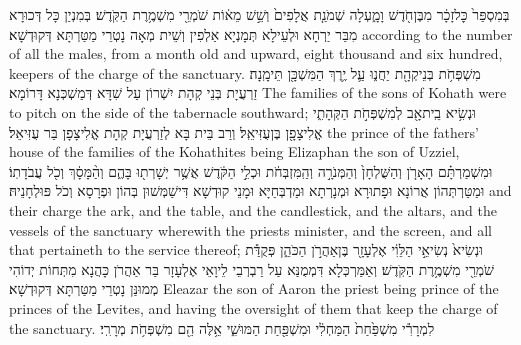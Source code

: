 {בְּמִסְפַּר֙ כׇּל\maqqaf זָכָ֔ר מִבֶּן\maqqaf חֹ֖דֶשׁ וָמָ֑עְלָה שְׁמֹנַ֤ת אֲלָפִים֙ וְשֵׁ֣שׁ מֵא֔וֹת שֹׁמְרֵ֖י מִשְׁמֶ֥רֶת הַקֹּֽדֶשׁ׃}
{בְּמִנְיַן כָּל דְּכוּרָא מִבַּר יַרְחָא וּלְעֵילָא תְּמָנְיָא אַלְפִין וְשֵׁית מְאָה נָטְרֵי מַטַּרְתָּא דְּקוּדְשָׁא׃}
{according to the number of all the males, from a month old and upward, eight thousand and six hundred, keepers of the charge of the sanctuary.}{}
{מִשְׁפְּחֹ֥ת בְּנֵי\maqqaf קְהָ֖ת יַחֲנ֑וּ עַ֛ל יֶ֥רֶךְ הַמִּשְׁכָּ֖ן תֵּימָֽנָה׃}
{זַרְעֲיָת בְּנֵי קְהָת יִשְׁרוֹן עַל שִׁדָּא דְּמַשְׁכְּנָא דָּרוֹמָא׃}
{The families of the sons of Kohath were to pitch on the side of the tabernacle southward;}{}
{וּנְשִׂ֥יא בֵֽית\maqqaf אָ֖ב לְמִשְׁפְּחֹ֣ת הַקְּהָתִ֑י אֱלִיצָפָ֖ן בֶּן\maqqaf עֻזִּיאֵֽל׃}
{וְרַב בֵּית בָּא לְזַרְעֲיָת קְהָת אֱלִיצָפָן בַּר עֻזִּיאֵל׃}
{the prince of the fathers’ house of the families of the Kohathites being Elizaphan the son of Uzziel,}{}
{וּמִשְׁמַרְתָּ֗ם הָאָרֹ֤ן וְהַשֻּׁלְחָן֙ וְהַמְּנֹרָ֣ה וְהַֽמִּזְבְּחֹ֔ת וּכְלֵ֣י הַקֹּ֔דֶשׁ אֲשֶׁ֥ר יְשָׁרְת֖וּ בָּהֶ֑ם וְהַ֨מָּסָ֔ךְ וְכֹ֖ל עֲבֹדָתֽוֹ׃}
{וּמַטַּרְתְּהוֹן אֲרוֹנָא וּפָתוּרָא וּמְנָרְתָא וּמַדְבְּחַיָּא וּמָנֵי קוּדְשָׁא דִּישַׁמְּשׁוּן בְּהוֹן וּפְרָסָא וְכֹל פּוּלְחָנֵיהּ׃}
{and their charge the ark, and the table, and the candlestick, and the altars, and the vessels of the sanctuary wherewith the priests minister, and the screen, and all that pertaineth to the service thereof;}{}
{וּנְשִׂיא֙ נְשִׂיאֵ֣י הַלֵּוִ֔י אֶלְעָזָ֖ר בֶּן\maqqaf אַהֲרֹ֣ן הַכֹּהֵ֑ן פְּקֻדַּ֕ת שֹׁמְרֵ֖י מִשְׁמֶ֥רֶת הַקֹּֽדֶשׁ׃}
{וְאַמַּרְכְּלָא דִּמְמֻנַּא עַל רַבְרְבֵי לֵיוָאֵי אֶלְעָזָר בַּר אַהֲרֹן כָּהֲנָא מִתְּחוֹת יְדוֹהִי מְמוּנַּן נָטְרֵי מַטַּרְתָּא דְּקוּדְשָׁא׃}
{Eleazar the son of Aaron the priest being prince of the princes of the Levites, and having the oversight of them that keep the charge of the sanctuary.}{}
{לִמְרָרִ֕י מִשְׁפַּ֙חַת֙ הַמַּחְלִ֔י וּמִשְׁפַּ֖חַת הַמּוּשִׁ֑י אֵ֥לֶּה הֵ֖ם מִשְׁפְּחֹ֥ת מְרָרִֽי׃}

